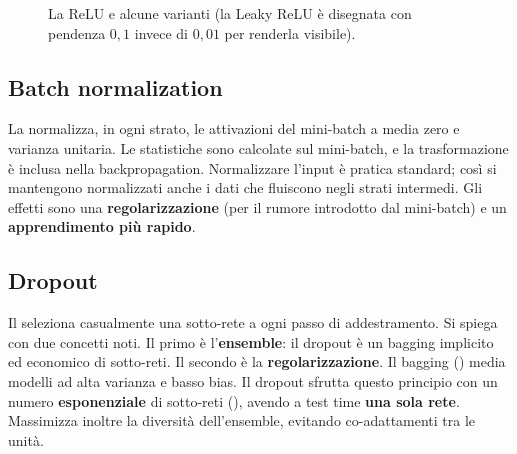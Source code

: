 \begin{figure}[ht]
\centering
{}
\caption{La ReLU e alcune varianti (la Leaky ReLU è disegnata con pendenza $0{,}1$ invece di $0{,}01$ per renderla
visibile).}
\label{fig:relu}
\end{figure}

\subsection{Batch normalization}

La  normalizza, in ogni strato, le attivazioni del mini-batch a media zero e varianza
unitaria. Le statistiche sono calcolate sul mini-batch, e la trasformazione è inclusa nella backpropagation.
Normalizzare l'input è pratica standard; così si mantengono normalizzati anche i dati che fluiscono negli strati
intermedi. Gli effetti sono una \textbf{regolarizzazione} (per il rumore introdotto dal mini-batch) e un
\textbf{apprendimento più rapido}.

\subsection{Dropout}
\label{sec:dropout}

Il  seleziona casualmente una sotto-rete a ogni passo di addestramento. Si spiega con due concetti
noti. Il primo è l'\textbf{ensemble}: il dropout è un bagging implicito ed economico di sotto-reti. Il secondo è la
\textbf{regolarizzazione}. Il bagging () media modelli ad alta varianza e basso bias. Il dropout
sfrutta questo principio con un numero \textbf{esponenziale} di sotto-reti (), avendo a test
time \textbf{una sola rete}. Massimizza inoltre la diversità dell'ensemble, evitando co-adattamenti tra le unità.

